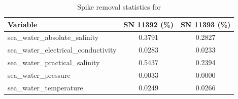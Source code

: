 \begin{table}[h]
\centering
\caption{Spike removal statistics for \projectname{} \casenumber{}}
\label{tab:ntas14_spike_stats}
\begin{tabular}{|l|c|c|}
\hline
Variable & SN 11392 (\%) & SN 11393 (\%) \\
\hline
sea\_water\_absolute\_salinity & 0.3791 & 0.2827 \\
sea\_water\_electrical\_conductivity & 0.0283 & 0.0233 \\
sea\_water\_practical\_salinity & 0.5437 & 0.2394 \\
sea\_water\_pressure & 0.0033 & 0.0000 \\
sea\_water\_temperature & 0.0249 & 0.0266 \\
\hline
\end{tabular}
\end{table}
